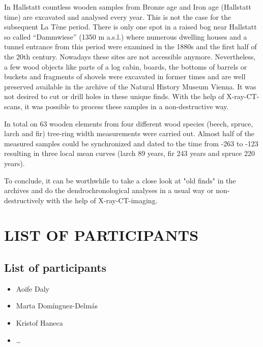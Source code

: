 \documentclass[
]{book}
\providecommand{\tightlist}{%
  \setlength{\itemsep}{0pt}\setlength{\parskip}{0pt}}
\begin{document}
In Hallstatt countless wooden samples from Bronze age and Iron age (Hallstatt time) are excavated and analysed every year. This is not the case for the subsequent La Tène period. There is only one spot in a raised bog near Hallstatt so called ``Dammwiese'' (1350 m a.s.l.) where numerous dwelling houses and a tunnel entrance from this period were examined in the 1880s and the first half of the 20th century. Nowadays these sites are not accessible anymore. Nevertheless, a few wood objects like parts of a log cabin, boards, the bottoms of barrels or buckets and fragments of shovels were excavated in former times and are well preserved available in the archive of the Natural History Museum Vienna. It was not desired to cut or drill holes in these unique finds. With the help of X-ray-CT-scans, it was possible to process these samples in a non-destructive way.

In total on 63 wooden elements from four different wood species (beech, spruce, larch and fir) tree-ring width measurements were carried out. Almost half of the measured samples could be synchronized and dated to the time from -263 to -123 resulting in three local mean curves (larch 89 years, fir 243 years and spruce 220 years).

To conclude, it can be worthwhile to take a close look at "old finds" in the archives and do the dendrochronological analyses in a usual way or non-destructively with the help of X-ray-CT-imaging.

\hypertarget{part-list-of-participants}{%
\part*{LIST OF PARTICIPANTS}\label{part-list-of-participants}}

\hypertarget{list-of-participants}{%
\chapter*{List of participants}\label{list-of-participants}}

\begin{itemize}
\tightlist
\item
  Aoife Daly
\item
  Marta Domínguez-Delmás
\item
  Kristof Haneca
\item
  \ldots{}
\end{itemize}
\end{document}
